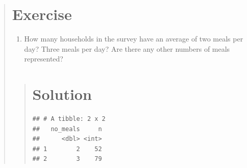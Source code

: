 \documentclass[]{book}
\newenvironment{Shaded}{\begin{snugshade}}{\end{snugshade}}
\newcommand{\KeywordTok}[1]{\textcolor[rgb]{0.13,0.29,0.53}{\textbf{#1}}}
\newcommand{\StringTok}[1]{\textcolor[rgb]{0.31,0.60,0.02}{#1}}
\newcommand{\OperatorTok}[1]{\textcolor[rgb]{0.81,0.36,0.00}{\textbf{#1}}}
\newcommand{\NormalTok}[1]{#1}
\providecommand{\tightlist}{%
  \setlength{\itemsep}{0pt}\setlength{\parskip}{0pt}}
\begin{document}
\begin{quote}
\section{Exercise}\label{exercise-9}

\begin{enumerate}
\def\labelenumi{\arabic{enumi}.}
\tightlist
\item
  How many households in the survey have an average of two meals per
  day? Three meals per day? Are there any other numbers of meals
  represented?
\end{enumerate}

\begin{quote}
\section{Solution}\label{solution-8}

\begin{Shaded}
\end{Shaded}

\begin{verbatim}
## # A tibble: 2 x 2
##   no_meals     n
##      <dbl> <int>
## 1        2    52
## 2        3    79
\end{verbatim}
\end{quote}
\end{quote}
\end{document}
